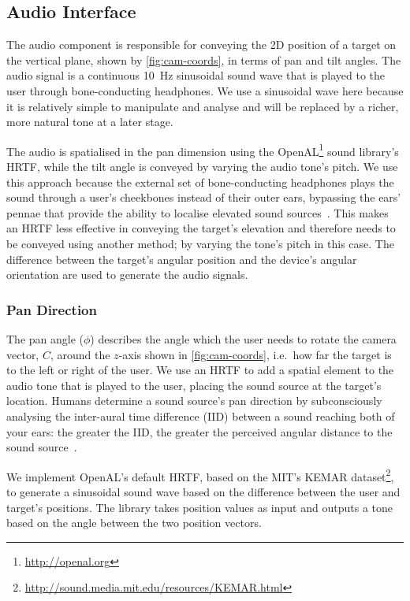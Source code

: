 \documentclass{llncs}
\begin{document}
\subsection{Audio Interface}

The audio component is responsible for conveying the 2D position of a target on the vertical plane, shown by \cref{fig:cam-coords}, in terms of pan and tilt angles.
The audio signal is a continuous \SI{10}{\hertz} sinusoidal sound wave that is played to the user through bone-conducting headphones.
We use a sinusoidal wave here because it is relatively simple to manipulate and analyse and will be replaced by a richer, more natural tone at a later stage. 

The audio is spatialised in the pan dimension using the OpenAL\footnote{\url{http://openal.org}} sound library's HRTF, while the tilt angle is conveyed by varying the audio tone's pitch.
We use this approach because the external set of bone-conducting headphones plays the sound through a user's cheekbones instead of their outer ears, bypassing the ears' pennae that provide the ability to localise elevated sound sources~\cite{roffler1968factors,algazi2001elevation}.
This makes an HRTF less effective in conveying the target's elevation and therefore needs to be conveyed using another method; by varying the tone's pitch in this case.
The difference between the target's angular position and the device's angular orientation are used to generate the audio signals. 

\subsubsection{Pan Direction}

The pan angle ($\phi$) describes the angle which the user needs to rotate the camera vector, $C$, around the $z$-axis shown in \cref{fig:cam-coords}, i.e.\ how far the target is to the left or right of the user.
We use an HRTF to add a spatial element to the audio tone that is played to the user, placing the sound source at the target's location. 
Humans determine a sound source's pan direction by subconsciously analysing the inter-aural time difference (IID) between a sound reaching both of your ears: the greater the IID, the greater the perceived angular distance to the sound source~\cite{wightman1992dominant}.

We implement OpenAL's default HRTF, based on the MIT's KEMAR dataset\footnote{\url{http://sound.media.mit.edu/resources/KEMAR.html}}, to generate a sinusoidal sound wave based on the difference between the user and target's positions.
The library takes position values as input and outputs a tone based on the angle between the two position vectors. 
\end{document}
